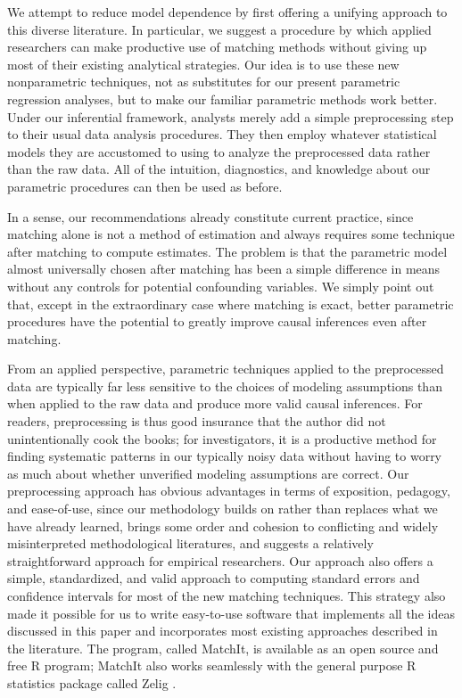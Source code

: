 \documentclass[11pt,titlepage]{article}
\begin{document}
We attempt to reduce model dependence by first offering a unifying
approach to this diverse literature.  In particular, we suggest a
procedure by which applied researchers can make productive use of
matching methods without giving up most of their existing analytical
strategies.  Our idea is to use these new nonparametric techniques,
not as substitutes for our present parametric regression analyses, but
to make our familiar parametric methods work better.  Under our
inferential framework, analysts merely add a simple preprocessing step
to their usual data analysis procedures.  They then employ whatever
statistical models they are accustomed to using to analyze the
preprocessed data rather than the raw data.  All of the intuition,
diagnostics, and knowledge about our parametric procedures can then be
used as before.

In a sense, our recommendations already constitute current practice,
since matching alone is not a method of estimation and always requires
some technique after matching to compute estimates.  The problem is
that the parametric model almost universally chosen after matching has
been a simple difference in means without any controls for potential
confounding variables.  We simply point out that, except in the
extraordinary case where matching is exact, better parametric
procedures have the potential to greatly improve causal inferences
even after matching.

From an applied perspective, parametric techniques applied to the
preprocessed data are typically far less sensitive to the choices of
modeling assumptions than when applied to the raw data and produce
more valid causal inferences.  For readers, preprocessing is thus good
insurance that the author did not unintentionally cook the books; for
investigators, it is a productive method for finding systematic
patterns in our typically noisy data without having to worry as much
about whether unverified modeling assumptions are correct.  Our
preprocessing approach has obvious advantages in terms of exposition,
pedagogy, and ease-of-use, since our methodology builds on rather than
replaces what we have already learned, brings some order and cohesion
to conflicting and widely misinterpreted methodological literatures,
and suggests a relatively straightforward approach for empirical
researchers. Our approach also offers a simple, standardized, and
valid approach to computing standard errors and confidence intervals
for most of the new matching techniques.  This strategy also made it
possible for us to write easy-to-use software that implements all the
ideas discussed in this paper and incorporates most existing approaches
described in the literature.  The program, called MatchIt, is
available as an open source and free R program; MatchIt also works
seamlessly with the general purpose R statistics package called Zelig
\citep{ImaKinLau04}.
\end{document}
